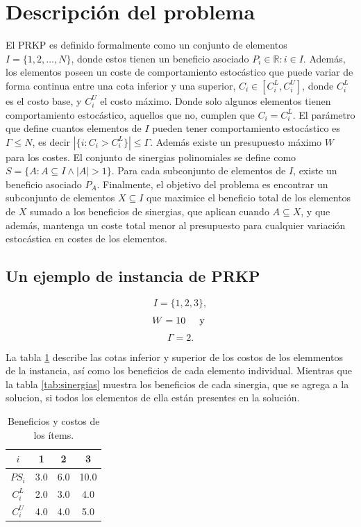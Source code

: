 \documentclass[spanish, a4paper, 12pt, openany,final]{book}
\begin{document}
\section{Descripción del problema}
	El PRKP es definido formalmente como un conjunto de elementos $I = \{1,2,\hdots,N\}$, donde estos tienen un beneficio asociado $P_i \in \mathbb{R}:i\in I$. Además, los elementos poseen un coste de comportamiento estocástico que puede variar de forma continua entre una cota inferior y una superior, $C_i \in [C^L_i,C^U_i]$, donde $C^L_i$ es el costo base, y $C^U_i$ el costo máximo. Donde solo algunos elementos tienen comportamiento estocástico, aquellos que no, cumplen que $C_i = C^L_i$. El parámetro que define cuantos elementos de $I$ pueden tener comportamiento estocástico es $\Gamma\leq N$, es decir $|\{i: C_i > C^L_i\}| \leq \Gamma$. 	Además existe un presupuesto máximo $W$ para los costes. El conjunto de sinergias polinomiales se define como $S = \{ A: A \subseteq I \land |A|>1  \}$. Para cada subconjunto de elementos de $I$, existe un beneficio asociado $P_A$. Finalmente, el objetivo del problema es encontrar un subconjunto de elementos $X \subseteq I$ que maximice el beneficio total de los elementos de $X$ sumado a los beneficios de sinergias, que aplican cuando $A\subseteq X$, y que además, mantenga un coste total menor al presupuesto para cualquier variación estocástica en costes de los elementos.
	
	\subsection*{Un ejemplo de instancia de PRKP}
		$$I =\{1,2,3\},$$
		$$W = 10 \hspace{0.5cm}\text{y }$$ 
		$$\Gamma = 2 \text{.}$$
		
	La tabla \ref{tab:example_p} describe las cotas inferior y superior de los costos de los elemmentos de la instancia, así como los beneficios de cada elemento individual. Mientras que la tabla \ref{tab:sinergias} muestra los beneficios de cada sinergia, que se agrega a la solucion, si todos los elementos de ella están presentes en la solución.

	\begin{table}[H]
		\centering
		\label{tab:example_p}
		\caption{Beneficios y costos de los ítems.}
	\begin{tabular}{|c|c|c|c|}
		\hline
		$i$ & 1 & 2 & 3 \\
		\hline
		$PS_i$ & 3.0 & 6.0 & 10.0 \\
		\hline
		$C^L_i$ & 2.0 & 3.0 & 4.0 \\
		\hline
		$C^U_i$ & 4.0 & 4.0 & 5.0 \\
		\hline
	\end{tabular}
	
	\end{table}
	
\end{document}
